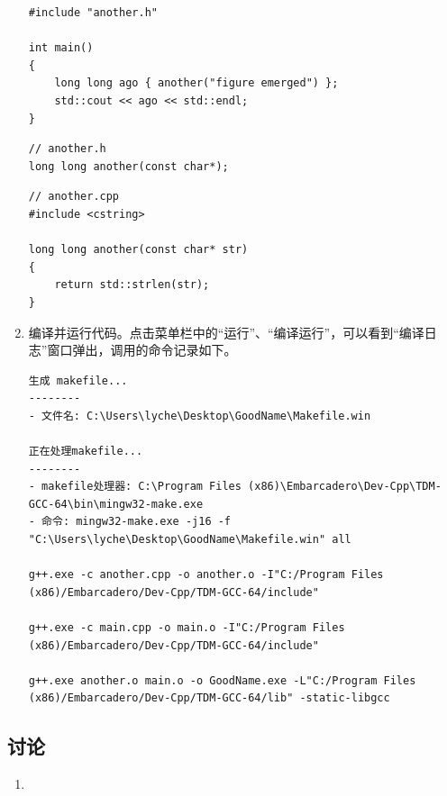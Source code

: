 \begin{enumerate}
\begin{lstlisting}[language={[17]C++}]
#include "another.h"

int main()
{
	long long ago { another("figure emerged") };
	std::cout << ago << std::endl;
}
	\end{lstlisting}

	\begin{lstlisting}[language={[17]C++}, moreemph={[2]another}]
// another.h
long long another(const char*);
	\end{lstlisting}

	\begin{lstlisting}[language={[17]C++}, moreemph={[2]another, strlen}]
// another.cpp
#include <cstring>

long long another(const char* str)
{
	return std::strlen(str);
}
	\end{lstlisting}

	\item 编译并运行代码。点击菜单栏中的“运行”、“编译运行”，可以看到“编译日志”窗口弹出，调用的命令记录如下。

	\begin{lstlisting}[language={}]
生成 makefile...
--------
- 文件名: C:\Users\lyche\Desktop\GoodName\Makefile.win

正在处理makefile...
--------
- makefile处理器: C:\Program Files (x86)\Embarcadero\Dev-Cpp\TDM-GCC-64\bin\mingw32-make.exe
- 命令: mingw32-make.exe -j16 -f "C:\Users\lyche\Desktop\GoodName\Makefile.win" all

g++.exe -c another.cpp -o another.o -I"C:/Program Files (x86)/Embarcadero/Dev-Cpp/TDM-GCC-64/include"

g++.exe -c main.cpp -o main.o -I"C:/Program Files (x86)/Embarcadero/Dev-Cpp/TDM-GCC-64/include"

g++.exe another.o main.o -o GoodName.exe -L"C:/Program Files (x86)/Embarcadero/Dev-Cpp/TDM-GCC-64/lib" -static-libgcc
	\end{lstlisting}
\end{enumerate}

\subsection*{讨论}

\begin{enumerate}
	\item
\end{enumerate}
